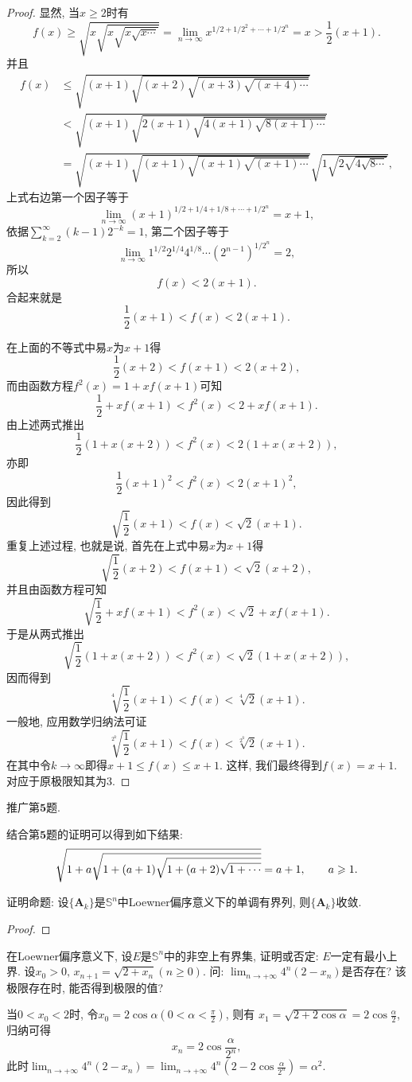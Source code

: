 \begin{quizb}
\begin{proof}
显然, 当\(x\geqslant 2\)时有\[f(x)\geqslant\sqrt{x\sqrt{x\sqrt{x\sqrt{x\cdots}}}}=\lim_{n\rightarrow\infty}x^{1/2+1/2^2+\cdots+1/2^n}=x>\frac{1}{2}(x+1).\]并且\[\begin{split}
f(x)&\leqslant\sqrt{(x+1)\sqrt{(x+2)\sqrt{(x+3)\sqrt{(x+4)\cdots}}}}\\
&<\sqrt{(x+1)\sqrt{2(x+1)\sqrt{4(x+1)\sqrt{8(x+1)\cdots}}}}\\
&=\sqrt{(x+1)\sqrt{(x+1)\sqrt{(x+1)\sqrt{(x+1)\cdots}}}}\sqrt{1\sqrt{2\sqrt{4\sqrt{8\cdots}}}},
\end{split}\]上式右边第一个因子等于\[\lim_{n\rightarrow\infty}(x+1)^{1/2+1/4+1/8+\cdots+1/2^n}=x+1,\]依据\(\sum_{k=2}^{\infty}(k-1)2^{-k}=1\), 第二个因子等于\[\lim_{n\rightarrow\infty}1^{1/2}2^{1/4}4^{1/8}\cdots(2^{n-1})^{1/2^n}=2,\]所以\[f(x)<2(x+1).\]合起来就是\[\frac{1}{2}(x+1)<f(x)<2(x+1).\]

在上面的不等式中易\(x\)为\(x+1\)得\[\frac{1}{2}(x+2)<f(x+1)<2(x+2),\]而由函数方程\(f^2(x)=1+xf(x+1)\)可知\[\frac{1}{2}+xf(x+1)<f^2(x)<2+xf(x+1).\]由上述两式推出\[\frac{1}{2}\left(1+x(x+2)\right)<f^2(x)<2(1+x(x+2)),\]亦即\[\frac{1}{2}(x+1)^2<f^2(x)<2(x+1)^2,\]因此得到\[\sqrt{\frac{1}{2}}(x+1)<f(x)<\sqrt{2}(x+1).\]重复上述过程, 也就是说, 首先在上式中易\(x\)为\(x+1\)得\[\sqrt{\frac{1}{2}}(x+2)<f(x+1)<\sqrt{2}(x+2),\]并且由函数方程可知\[\sqrt{\frac{1}{2}}+xf(x+1)<f^2(x)<\sqrt{2}+xf(x+1).\]于是从两式推出\[\sqrt{\frac{1}{2}}\left(1+x(x+2)\right)<f^2(x)<\sqrt{2}\left(1+x(x+2)\right),\]因而得到\[\sqrt[4]{\frac{1}{2}}(x+1)<f(x)<\sqrt[4]{2}(x+1).\]一般地, 应用数学归纳法可证\[\sqrt[2^k]{\frac{1}{2}}(x+1)<f(x)<\sqrt[2^k]{2}(x+1).\]在其中令\(k\rightarrow\infty\)即得\(x+1\leqslant f(x)\leqslant x+1\). 这样, 我们最终得到\(f(x)=x+1\). 对应于原极限知其为3.
\end{proof}
\woe 推广第\(\boldsymbol{5}\)题.
\begin{solution}
结合第\(\boldsymbol{5}\)题的证明可以得到如下结果:\[\sqrt{1+a\sqrt{1+(a+1)\sqrt{1+(a+2)\sqrt{1+\cdots}}}}=a+1,\qquad a\geqslant 1.\qedhere\]
\end{solution}
\woe 证明命题: 设\(\{\boldsymbol{A}_k\}\)是\(\mathbb{S}^n\)中Loewner偏序意义下的单调有界列, 则\(\{\boldsymbol{A}_k\}\)收敛.
\begin{proof}

\end{proof}
\woe 在Loewner偏序意义下, 设\(E\)是\(\mathbb{S}^n\)中的非空上有界集, 证明或否定: \(E\)一定有最小上界.
\woe 设\(x_0>0,\,x_{n+1}=\sqrt{2+x_n}(n\geqslant 0)\). 问: \(\lim_{n\rightarrow+\infty}4^n(2-x_n)\)是否存在? 该极限存在时, 能否得到极限的值?
\begin{solution}
当\(0<x_0< 2\)时, 令\(x_0=2\cos\alpha\left(0<\alpha<\frac{\pi}{2}\right)\), 则有
\(x_1=\sqrt{2+2\cos\alpha}=2\cos\frac{\alpha}{2}\), 归纳可得\[x_n=2\cos\frac{\alpha}{2^n},\]此时\(\lim_{n\rightarrow+\infty}4^n(2-x_n)=\lim_{n\rightarrow+\infty}4^n\left(2-2\cos\frac{\alpha}{2^n}\right)=\alpha^2.\)


\end{solution}
\end{quizb}

